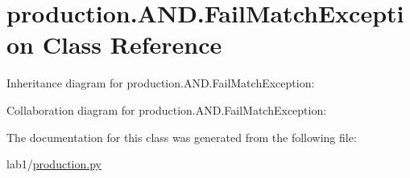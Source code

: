 \hypertarget{classproduction_1_1_a_n_d_1_1_fail_match_exception}{}\section{production.\+A\+N\+D.\+Fail\+Match\+Exception Class Reference}
\label{classproduction_1_1_a_n_d_1_1_fail_match_exception}


Inheritance diagram for production.\+A\+N\+D.\+Fail\+Match\+Exception\+:


Collaboration diagram for production.\+A\+N\+D.\+Fail\+Match\+Exception\+:


The documentation for this class was generated from the following file\+:\begin{DoxyCompactItemize}
\item 
lab1/\hyperlink{production_8py}{production.\+py}\end{DoxyCompactItemize}
